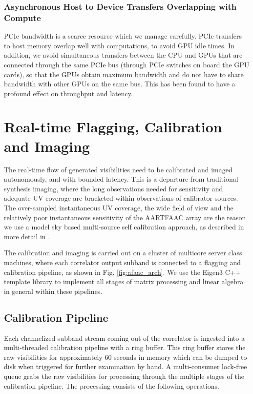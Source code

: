 \documentclass{ws-jai}
\begin{document}
\subsubsection  {Asynchronous  Host  to Device  Transfers  Overlapping  with  Compute}
 PCIe bandwidth is a scarce  resource which we manage carefully. PCIe
transfers  to host  memory overlap  well with  computations, to  avoid GPU  idle
times. In  addition, we avoid  simultaneous transfers  between the CPU  and GPUs
that are connected through the same PCIe bus (through PCIe switches on board the
GPU cards), so that  the GPUs obtain maximum bandwidth and do  not have to share
bandwidth  with other  GPUs on  the same  bus.  This has  been found  to have  a
profound effect on throughput and latency.\\

\section {\label{sec:calim} Real-time Flagging, Calibration and Imaging}
The real-time  flow of generated visibilities  need to be calibrated  and imaged
autonomously, and  with bounded latency.   This is a departure  from traditional
synthesis  imaging,  where the  long  observations  needed for  sensitivity  and
adequate   UV  coverage   are  bracketed   within  observations   of  calibrator
sources. The over-sampled instantaneous UV coverage,  the wide field of view and
the  relatively poor  instantaneous sensitivity  of the  AARTFAAC array  are the
reason  we use  a model  sky based  multi-source self  calibration approach,  as
described in more detail in \cite {prasad2014real}.

The calibration  and imaging  is carried  out on a  cluster of  multicore server
class machines, where each correlator output  subband is connected to a flagging
and calibration  pipeline, as  shown in Fig.   \ref{fig:afaac_arch}. We  use the
Eigen3 \citep{eigenweb} C++  template library to implement all  stages of matrix
processing and linear algebra in general within these pipelines.\\

\subsection{Calibration Pipeline} Each channelized subband stream coming out of the
correlator  is  ingested  into  a  multi-threaded  calibration  pipeline  with  a
ring buffer. This ring buffer  stores the raw visibilities  for approximately $60$
seconds  in memory  which  can be  dumped  to disk  when  triggered for  further
examination by hand. A multi-consumer lock-free queue grabs the raw visibilities
for  processing through  the multiple  stages of  the calibration  pipeline. The
processing consists of the following operations.\\
\end{document}

